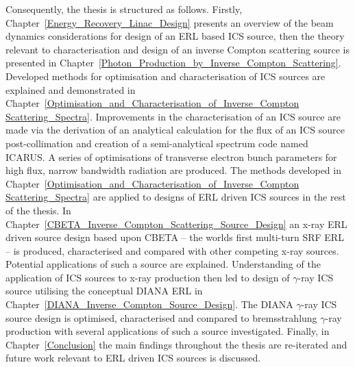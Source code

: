 \documentclass[../main.tex]{subfiles}
\begin{document}
Consequently, the thesis is structured as follows. Firstly,  Chapter~\ref{Energy_Recovery_Linac_Design} presents an overview of the beam dynamics considerations for design of an ERL based ICS source, then the theory relevant to characterisation and design of an inverse Compton scattering source is presented in Chapter~\ref{Photon_Production_by_Inverse_Compton_Scattering}. Developed methods for optimisation and characterisation of ICS sources are explained and demonstrated in Chapter~\ref{Optimisation_and_Characterisation_of_Inverse_Compton Scattering_Spectra}. Improvements in the characterisation of an ICS source are made via the derivation of an analytical calculation for the flux of an ICS source post-collimation and creation of a semi-analytical spectrum code named \textsc{ICARUS}. A series of optimisations of transverse electron bunch parameters for high flux, narrow bandwidth radiation are produced. The methods developed in Chapter~\ref{Optimisation_and_Characterisation_of_Inverse_Compton Scattering_Spectra} are applied to designs of ERL driven ICS sources in the rest of the thesis. In Chapter~\ref{CBETA_Inverse_Compton_Scattering_Source_Design} an x-ray ERL driven source design based upon CBETA -- the worlds first multi-turn SRF ERL -- is produced, characterised and compared with other competing x-ray sources. Potential applications of such a source are explained. Understanding of the application of ICS sources to x-ray production then led to design of $\gamma$-ray ICS source utilising the conceptual DIANA ERL in Chapter~\ref{DIANA_Inverse_Compton_Source_Design}. The DIANA $\gamma$-ray ICS source design is optimised, characterised and compared to bremsstrahlung $\gamma$-ray production with several applications of such a source investigated. Finally, in Chapter~\ref{Conclusion} the main findings throughout the thesis are re-iterated and future work relevant to ERL driven ICS sources is discussed.       
\end{document}
